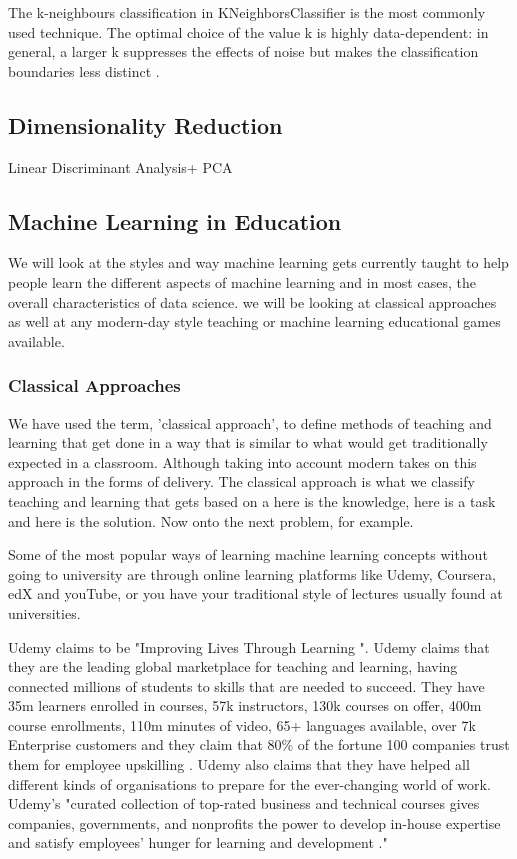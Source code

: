 		The k-neighbours classification in KNeighborsClassifier is the most commonly used technique. The optimal choice of the value k is highly data-dependent: in general, a larger k suppresses the effects of noise but makes the classification boundaries less distinct \cite{sklearn_knn}.
		
	\subsection{Dimensionality Reduction}
		\label{seb_sec:dd}
	
		Linear Discriminant Analysis+ PCA
	
	\subsection{Machine Learning in Education}
		\label{seb_sec:ml_in_learning}
	
	We will look at the styles and way machine learning gets currently taught to help people learn the different aspects of machine learning and in most cases, the overall characteristics of data science. we will be looking at classical approaches as well at any modern-day style teaching or machine learning educational games available. 
	
	\subsubsection{Classical Approaches}
		\label{sub_sec:classical_teach_learn}
		
		We have used the term, 'classical approach', to define methods of teaching and learning that get done in a way that is similar to what would get traditionally expected in a classroom.  Although taking into account modern takes on this approach in the forms of delivery. The classical approach is what we classify teaching and learning that gets based on a here is the knowledge, here is a task and here is the solution. Now onto the next problem, for example.
		
		Some of the most popular ways of learning machine learning concepts without going to university are through online learning platforms like Udemy, Coursera, edX and youTube, or you have your traditional style of lectures usually found at universities.
		
		Udemy claims to be "Improving Lives Through Learning \cite{udemy}". Udemy claims that they are the leading global marketplace for teaching and learning, having connected millions of students to skills that are needed to succeed. They have 35m learners enrolled in courses, 57k instructors, 130k courses on offer, 400m course enrollments, 110m minutes of video, 65+ languages available, over 7k Enterprise customers and they claim that 80\% of the fortune 100 companies trust them for employee upskilling \cite{udemy}. Udemy also claims that they have helped all different kinds of organisations to prepare for the ever-changing world of work. Udemy's "curated collection of top-rated business and technical courses gives companies, governments, and nonprofits the power to develop in-house expertise and satisfy employees' hunger for learning and development \cite{udemy}." 
		

